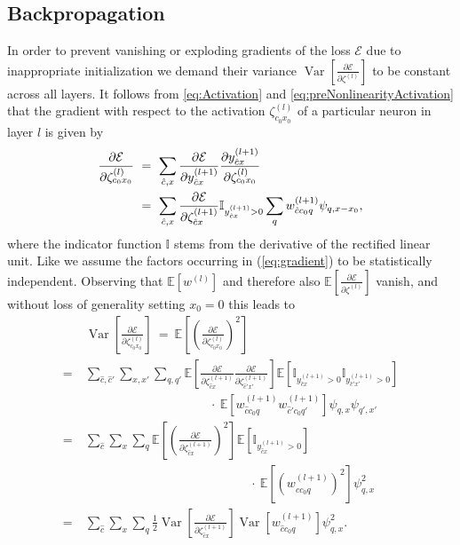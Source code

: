 \documentclass[10pt,twocolumn,letterpaper]{article}
\newcommand{\E}{\mathbb{E}}
\newcommand{\Var}{\operatorname{Var}}
\begin{document}
\subsection{Backpropagation}
In order to prevent vanishing or exploding gradients of the loss $\mathcal{E}$ due to inappropriate initialization we demand their variance $\Var\left[\frac{\partial\mathcal{E}}{\partial\zeta^{(l)}}\right]$ to be constant across all layers. 
It follows from \eqref{eq:Activation} and \eqref{eq:preNonlinearityActivation} that the gradient with respect to the activation $\zeta_{c_0 x_0}^{(l)}$ of a particular neuron in layer $l$ is given by
\begin{align}\label{eq:gradient}
	\frac{\partial\mathcal{E}}{\partial\zeta_{c_0x_0}^{(l)}}
	\ &=\ \sum\limits_{\hat{c},x} \frac{\partial\mathcal{E}}{\partial y_{\hat{c}x}^{(l+1)}} \frac{\partial y_{\hat{c}x}^{(l+1)}}{\partial\zeta_{c_0x_0}^{(l)}} \\\notag
	\ &=\ \sum\limits_{\hat{c},x} \frac{\partial\mathcal{E}}{\partial \zeta_{\hat{c}x}^{(l+1)}}\mathbb{I}_{y_{\hat{c}x}^{(l+1)}>0} \sum\limits_q w_{\hat{c}c_0q}^{(l+1)}\psi_{q,x-x_0},
\end{align}
where the indicator function $\mathbb{I}$ stems from the derivative of the rectified linear unit. Like \citet{DBLP:journals/corr/HeZR015} we assume the factors occurring in (\ref{eq:gradient}) to be statistically independent. Observing that $\E\left[w^{(l)}\right]$ and therefore also $\E\left[\frac{\partial\mathcal{E}}{\partial\zeta^{(l)}}\right]$ vanish, and without loss of generality setting $x_0=0$ this leads to
\allowdisplaybreaks
\begin{align*}
	&\ \Var\left[\frac{\partial\mathcal{E}}{\partial\zeta_{c_0x_0}^{(l)}}\right] 
	\ =\ \E\left[\left(\frac{\partial\mathcal{E}}{\partial\zeta_{c_0x_0}^{(l)}}\right)^2\right]\\
	=&\  \sum\limits_{\hat{c},\hat{c}'}\sum\limits_{x,x'}\sum\limits_{q,q'}\E\left[\frac{\partial\mathcal{E}}{\partial\zeta_{\hat{c}x}^{(l+1)}}\frac{\partial\mathcal{E}}{\partial\zeta_{\hat{c}'x'}^{(l+1)}}\right] \E\left[\mathbb{I}_{y_{\hat{c}x}^{(l+1)}>0}\mathbb{I}_{y_{\hat{c}'x'}^{(l+1)}>0}\right] \\
	&\qquad\qquad\qquad\qquad\qquad\ \cdot\ \E\left[w_{\hat{c}c_0q}^{(l+1)}w_{\hat{c}'c_0q'}^{(l+1)}\right]\psi_{q,x}\psi_{q',x'}\\
	=&\  \sum\limits_{\hat{c}}\sum\limits_{x}\sum\limits_{q}\E\left[\left(\frac{\partial\mathcal{E}}{\partial\zeta_{\hat{c}x}^{(l+1)}}\right)^2\right]\E\left[\mathbb{I}_{y_{\hat{c}x}^{(l+1)}>0}\right]\\
	&\qquad\qquad\qquad\qquad\qquad\qquad\quad\ \ \cdot\ \E\left[\left(w_{\hat{c}c_0q}^{(l+1)}\right)^2\right]\psi_{q,x}^2\\
	=&\ \sum\limits_{\hat{c}}\sum\limits_{x}\sum\limits_{q}\frac{1}{2}\Var\left[\frac{\partial\mathcal{E}}{\partial\zeta_{\hat{c}x}^{(l+1)}}\right]\Var\left[w_{\hat{c}c_0q}^{(l+1)}\right]\psi_{q,x}^2.
\end{align*}
\end{document}
